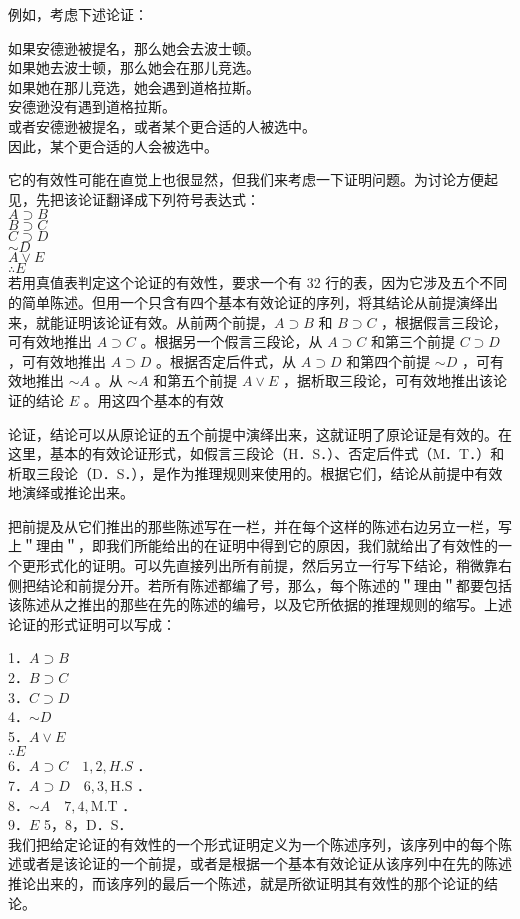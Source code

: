 例如，考虑下述论证：

如果安德逊被提名，那么她会去波士顿。\\
如果她去波士顿，那么她会在那儿竞选。\\
如果她在那儿竞选，她会遇到道格拉斯。\\
安德逊没有遇到道格拉斯。\\
或者安德逊被提名，或者某个更合适的人被选中。\\
因此，某个更合适的人会被选中。

它的有效性可能在直觉上也很显然，但我们来考虑一下证明问题。为讨论方便起见，先把该论证翻译成下列符号表达式：\\
$A \supset B$\\
$B \supset C$\\
$C \supset D$\\
$\sim D$\\
$A \vee E$\\
$\therefore E$\\
若用真值表判定这个论证的有效性，要求一个有 32 行的表，因为它涉及五个不同的简单陈述。但用一个只含有四个基本有效论证的序列，将其结论从前提演绎出来，就能证明该论证有效。从前两个前提，$A \supset B$ 和 $B \supset C$ ，根据假言三段论，可有效地推出 $A \supset C$ 。根据另一个假言三段论，从 $A \supset C$ 和第三个前提 $C \supset D$ ，可有效地推出 $A \supset D$ 。根据否定后件式，从 $A \supset D$ 和第四个前提 $\sim D$ ，可有效地推出 $\sim A$ 。从 $\sim A$ 和第五个前提 $A \vee E$ ，据析取三段论，可有效地推出该论证的结论 $E$ 。用这四个基本的有效

论证，结论可以从原论证的五个前提中演绎出来，这就证明了原论证是有效的。在这里，基本的有效论证形式，如假言三段论（H．S．）、否定后件式（M．T．）和析取三段论（D．S．），是作为推理规则来使用的。根据它们，结论从前提中有效地演绎或推论出来。

把前提及从它们推出的那些陈述写在一栏，并在每个这样的陈述右边另立一栏，写上＂理由＂，即我们所能给出的在证明中得到它的原因，我们就给出了有效性的一个更形式化的证明。可以先直接列出所有前提，然后另立一行写下结论，稍微靠右侧把结论和前提分开。若所有陈述都编了号，那么，每个陈述的＂理由＂都要包括该陈述从之推出的那些在先的陈述的编号，以及它所依据的推理规则的缩写。上述论证的形式证明可以写成：

1．$A \supset B$\\
2．$B \supset C$\\
3．$C \supset D$\\
4．$\sim D$\\
5．$A \vee E$\\
$\therefore E$\\
6．$A \supset C \quad 1,2, H . S$ ．\\
7．$A \supset D \quad 6,3, \mathrm{H} . \mathrm{S}$ ．\\
8．$\sim A \quad 7,4, \mathrm{M} . \mathrm{T}$ ．\\
9．$E$ 5，8，D．S．\\
我们把给定论证的有效性的一个形式证明定义为一个陈述序列，该序列中的每个陈述或者是该论证的一个前提，或者是根据一个基本有效论证从该序列中在先的陈述推论出来的，而该序列的最后一个陈述，就是所欲证明其有效性的那个论证的结论。

